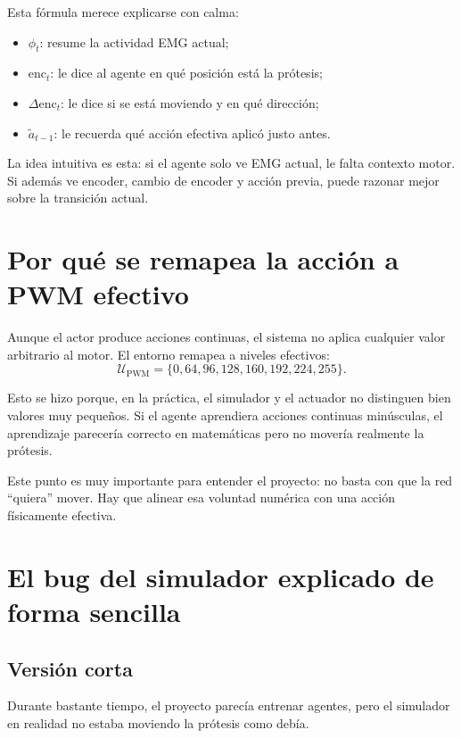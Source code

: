 \documentclass[11pt,a4paper]{article}
\begin{document}
Esta f\'ormula merece explicarse con calma:
\begin{itemize}[leftmargin=1.2cm]
    \item \(\phi_t\): resume la actividad EMG actual;
    \item \(\mathrm{enc}_t\): le dice al agente en qu\'e posici\'on est\'a la pr\'otesis;
    \item \(\Delta \mathrm{enc}_t\): le dice si se est\'a moviendo y en qu\'e direcci\'on;
    \item \(\tilde{a}_{t-1}\): le recuerda qu\'e acci\'on efectiva aplic\'o justo antes.
\end{itemize}

La idea intuitiva es esta: si el agente solo ve EMG actual, le falta contexto motor. Si adem\'as ve encoder, cambio de encoder y acci\'on previa, puede razonar mejor sobre la transici\'on actual.

\section{Por qu\'e se remapea la acci\'on a PWM efectivo}

Aunque el actor produce acciones continuas, el sistema no aplica cualquier valor arbitrario al motor. El entorno remapea a niveles efectivos:
\begin{equation}
\mathcal{U}_{\mathrm{PWM}} = \{0, 64, 96, 128, 160, 192, 224, 255\}.
\end{equation}

Esto se hizo porque, en la pr\'actica, el simulador y el actuador no distinguen bien valores muy peque\~nos. Si el agente aprendiera acciones continuas min\'usculas, el aprendizaje parecer\'ia correcto en matem\'aticas pero no mover\'ia realmente la pr\'otesis.

Este punto es muy importante para entender el proyecto: no basta con que la red ``quiera'' mover. Hay que alinear esa voluntad num\'erica con una acci\'on f\'isicamente efectiva.

\section{El bug del simulador explicado de forma sencilla}

\subsection{Versi\'on corta}

Durante bastante tiempo, el proyecto parec\'ia entrenar agentes, pero el simulador en realidad no estaba moviendo la pr\'otesis como deb\'ia.
\end{document}
